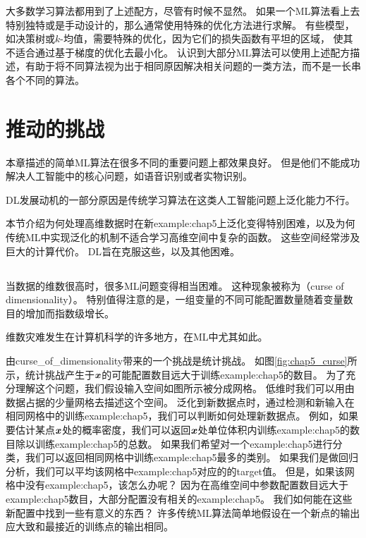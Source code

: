 大多数学习算法都用到了上述配方，尽管有时候不显然。
如果一个\gls{ML}算法看上去特别独特或是手动设计的，那么通常使用特殊的优化方法进行求解。
有些模型，如决策树或$k$-均值，需要特殊的优化，因为它们的损失函数有平坦的区域，
使其不适合通过基于梯度的优化去最小化。
认识到大部分\gls{ML}算法可以使用上述配方描述，有助于将不同算法视为出于相同原因解决相关问题的一类方法，而不是一长串各个不同的算法。


\section{推动的挑战}
\label{sec:challenges_motivating_deep_learning}
本章描述的简单\gls{ML}算法在很多不同的重要问题上都效果良好。
但是他们不能成功解决人工智能中的核心问题，如语音识别或者实物识别。

\gls{DL}发展动机的一部分原因是传统学习算法在这类人工智能问题上泛化能力不行。

本节介绍为何处理高维数据时在新\gls{example:chap5}上泛化变得特别困难，以及为何传统\gls{ML}中实现泛化的机制不适合学习高维空间中复杂的函数。
这些空间经常涉及巨大的计算代价。
\gls{DL}旨在克服这些，以及其他困难。

\subsection{}
\label{sec:the_curse_of_dimensionality}
当数据的维数很高时，很多\gls{ML}问题变得相当困难。
这种现象被称为（curse of dimensionality）。
特别值得注意的是，一组变量的不同可能配置数量随着变量数目的增加而指数级增长。

维数灾难发生在计算机科学的许多地方，在\gls{ML}中尤其如此。

由\gls{curse_of_dimensionality}带来的一个挑战是统计挑战。
如图\ref{fig:chap5_curse}所示，统计挑战产生于$\boldsymbol{\mathit{x}}$的可能配置数目远大于训练\gls{example:chap5}的数目。
为了充分理解这个问题，我们假设输入空间如图所示被分成网格。
低维时我们可以用由数据占据的少量网格去描述这个空间。
泛化到新数据点时，通过检测和新输入在相同网格中的训练\gls{example:chap5}，我们可以判断如何处理新数据点。
例如，如果要估计某点$\boldsymbol{\mathit{x}}$处的概率密度，我们可以返回$\boldsymbol{\mathit{x}}$处单位体积内训练\gls{example:chap5}的数目除以训练\gls{example:chap5}的总数。
如果我们希望对一个\gls{example:chap5}进行分类，我们可以返回相同网格中训练\gls{example:chap5}最多的类别。
如果我们是做回归分析，我们可以平均该网格中\gls{example:chap5}对应的的\gls{target}值。
但是，如果该网格中没有\gls{example:chap5}，该怎么办呢？
因为在高维空间中参数配置数目远大于\gls{example:chap5}数目，大部分配置没有相关的\gls{example:chap5}。
我们如何能在这些新配置中找到一些有意义的东西？
许多传统\gls{ML}算法简单地假设在一个新点的输出应大致和最接近的训练点的输出相同。


